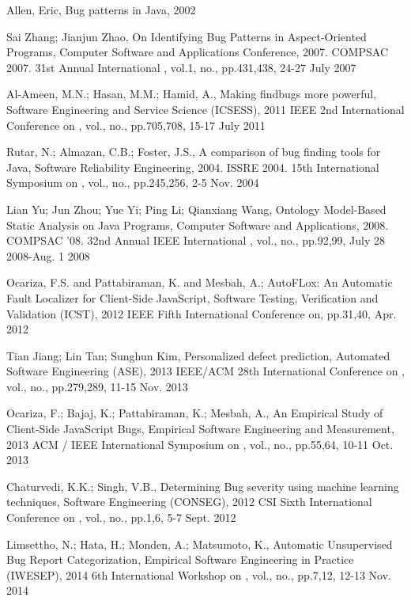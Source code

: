 \documentclass[conference]{IEEEtran}
\begin{document}
\begin{thebibliography}{1}
   Allen, Eric, Bug patterns in Java, 2002

   Sai Zhang; Jianjun Zhao, On Identifying Bug Patterns in Aspect-Oriented Programs, Computer Software and Applications Conference, 2007. COMPSAC 2007. 31st Annual International , vol.1, no., pp.431,438, 24-27 July 2007

   Al-Ameen, M.N.; Hasan, M.M.; Hamid, A., Making findbugs more powerful, Software Engineering and Service Science (ICSESS), 2011 IEEE 2nd International Conference on , vol., no., pp.705,708, 15-17 July 2011

   Rutar, N.; Almazan, C.B.; Foster, J.S., A comparison of bug finding tools for Java, Software Reliability Engineering, 2004. ISSRE 2004. 15th International Symposium on , vol., no., pp.245,256, 2-5 Nov. 2004

   Lian Yu; Jun Zhou; Yue Yi; Ping Li; Qianxiang Wang, Ontology Model-Based Static Analysis on Java Programs, Computer Software and Applications, 2008. COMPSAC '08. 32nd Annual IEEE International , vol., no., pp.92,99, July 28 2008-Aug. 1 2008

   Ocariza, F.S. and Pattabiraman, K. and Mesbah, A.; AutoFLox: An Automatic Fault Localizer for Client-Side JavaScript, Software Testing, Verification and Validation (ICST), 2012 IEEE Fifth International Conference on, pp.31,40, Apr. 2012

   Tian Jiang; Lin Tan; Sunghun Kim, Personalized defect prediction, Automated Software Engineering (ASE), 2013 IEEE/ACM 28th International Conference on , vol., no., pp.279,289, 11-15 Nov. 2013

   Ocariza, F.; Bajaj, K.; Pattabiraman, K.; Mesbah, A., An Empirical Study of Client-Side JavaScript Bugs, Empirical Software Engineering and Measurement, 2013 ACM / IEEE International Symposium on , vol., no., pp.55,64, 10-11 Oct. 2013

   Chaturvedi, K.K.; Singh, V.B., Determining Bug severity using machine learning techniques, Software Engineering (CONSEG), 2012 CSI Sixth International Conference on , vol., no., pp.1,6, 5-7 Sept. 2012

   Limsettho, N.; Hata, H.; Monden, A.; Matsumoto, K., Automatic Unsupervised Bug Report Categorization, Empirical Software Engineering in Practice (IWESEP), 2014 6th International Workshop on , vol., no., pp.7,12, 12-13 Nov. 2014


\end{thebibliography}
\end{document}
